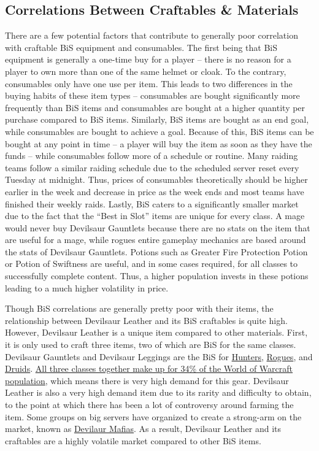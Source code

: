 \documentclass[sigconf]{acmart}
\begin{document}
\subsection{Correlations Between Craftables \& Materials}
There are a few potential factors that contribute to generally poor correlation with craftable BiS equipment and consumables. The first being that BiS equipment is generally a one-time buy for a player – there is no reason for a player to own more than one of the same helmet or cloak. To the contrary, consumables only have one use per item. This leads to two differences in the buying habits of these item types – consumables are bought significantly more frequently than BiS items and consumables are bought at a higher quantity per purchase compared to BiS items. Similarly, BiS items are bought as an end goal, while consumables are bought to achieve a goal. Because of this, BiS items can be bought at any point in time – a player will buy the item as soon as they have the funds – while consumables follow more of a schedule or routine. Many raiding teams follow a similar raiding schedule due to the scheduled server reset every Tuesday at midnight. Thus, prices of consumables theoretically should be higher earlier in the week and decrease in price as the week ends and most teams have finished their weekly raids. Lastly, BiS caters to a significantly smaller market due to the fact that the “Best in Slot” items are unique for every class. A mage would never buy Devilsaur Gauntlets because there are no stats on the item that are useful for a mage, while rogues entire gameplay mechanics are based around the stats of Devilsaur Gauntlets. Potions such as Greater Fire Protection Potion or Potion of Swiftness are useful, and in some cases required, for all classes to successfully complete content. Thus, a higher population invests in these potions leading to a much higher volatility in price.

Though BiS correlations are generally pretty poor with their items, the relationship between Devilsaur Leather and its BiS craftables is quite high. However, Devilsaur Leather is a unique item compared to other materials. First, it is only used to craft three items, two of which are BiS for the same classes. Devilsaur Gauntlets and Devilsaur Leggings are the BiS for \href{https://www.icy-veins.com/wow-classic/hunter-dps-pve-gear-best-in-slot}{Hunters}, \href{https://www.icy-veins.com/wow-classic/rogue-dps-pve-gear-best-in-slot}{Rogues}, and \href{https://www.icy-veins.com/wow-classic/feral-druid-melee-dps-pve-gear-best-in-slot}{Druids}. \href{https://wowclassicpopulation.com/characters?faction=Alliance&minLevel=60&realm=4647_Grobbulus}{All three classes together make up for 34\% of the World of Warcraft population}, which means there is very high demand for this gear. Devilsaur Leather is also a very high demand item due to its rarity and difficulty to obtain, to the point at which there has been a lot of controversy around farming the item. Some groups on big servers have organized to create a strong-arm on the market, known as \href{https://www.reddit.com/r/classicwow/search/?q=Devilsaur\%20mafia&restrict_sr=1}{Devilaur Mafias}. As a result, Devilsaur Leather and its craftables are a highly volatile market compared to other BiS items.
\end{document}
